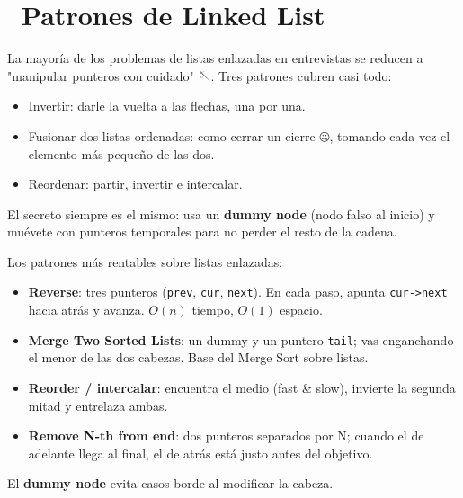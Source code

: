 \chapter[\emj{🧵}~Patrones de Linked List (Reverse, Merge, Reorder)]{~Patrones de Linked List}

\begin{dsaquees}

La mayoría de los problemas de listas enlazadas en entrevistas se
reducen a "manipular punteros con cuidado" 🪡. Tres patrones cubren casi
todo:

\begin{itemize}
\item Invertir: darle la vuelta a las flechas, una por una.
\item Fusionar dos listas ordenadas: como cerrar un cierre 🤐, tomando
      cada vez el elemento más pequeño de las dos.
\item Reordenar: partir, invertir e intercalar.
\end{itemize}

El secreto siempre es el mismo: usa un \textbf{dummy node} (nodo falso al
inicio) y muévete con punteros temporales para no perder el resto de la
cadena.

\end{dsaquees}

\begin{dsaotraforma}

Los patrones más rentables sobre listas enlazadas:

\begin{itemize}
\item \textbf{Reverse}: tres punteros (\verb|prev|, \verb|cur|,
      \verb|next|). En cada paso, apunta \verb|cur->next| hacia atrás y
      avanza. $O(n)$ tiempo, $O(1)$ espacio.
\item \textbf{Merge Two Sorted Lists}: un dummy y un puntero \verb|tail|;
      vas enganchando el menor de las dos cabezas. Base del Merge Sort
      sobre listas.
\item \textbf{Reorder / intercalar}: encuentra el medio (fast \& slow),
      invierte la segunda mitad y entrelaza ambas.
\item \textbf{Remove N-th from end}: dos punteros separados por N; cuando
      el de adelante llega al final, el de atrás está justo antes del
      objetivo.
\end{itemize}

El \textbf{dummy node} evita casos borde al modificar la cabeza.

\end{dsaotraforma}

